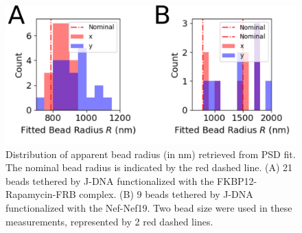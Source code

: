 \documentclass{biophys-new}
\begin{document}
\begin{figure}[hbt!]
	\centering
	\includegraphics[width=0.6\linewidth]{Figures/fig_Radius.png}
	\caption{Distribution of apparent bead radius (in nm) retrieved from PSD fit. The nominal bead radius is indicated by the red dashed line. (A) 21 beads tethered by J-DNA functionalized with the FKBP12-Rapamycin-FRB complex. (B) 9 beads tethered by J-DNA functionalized with the Nef-Nef19. Two bead size were used in these measurements, represented by 2 red dashed lines.}
	\label{fig:Rdiffusion}
\end{figure}

%

\begin{figure}[hbt!]
	\centering

\end{figure}

\end{document}
